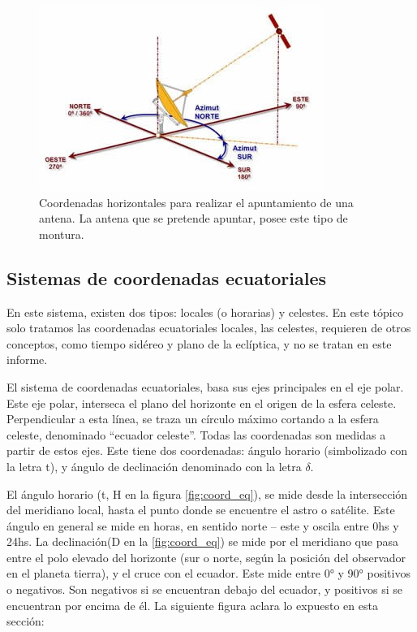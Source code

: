 \begin{figure}[ht!]
	\centering 
	\includegraphics{movimiento_antena_hor}
	\caption{Coordenadas horizontales para realizar el apuntamiento de una antena. La antena que se pretende apuntar, posee este tipo de montura.}
\end{figure}

\subsection{Sistemas de coordenadas ecuatoriales} 

En este sistema, existen dos tipos: locales (o horarias) y celestes. En este tópico solo tratamos las coordenadas ecuatoriales locales, las celestes, requieren de otros conceptos, como tiempo sidéreo y plano de la eclíptica, y no se tratan en este informe.


El sistema de coordenadas ecuatoriales, basa sus ejes principales en el eje polar. Este eje polar, interseca el plano del horizonte en el origen de la esfera celeste. Perpendicular a esta línea, se traza un círculo máximo cortando a la esfera celeste, denominado ``ecuador celeste''. Todas las coordenadas son medidas a partir de estos ejes. Este tiene dos coordenadas: ángulo horario (simbolizado con la letra t), y ángulo de declinación denominado con la letra $\delta$.

 
El ángulo horario (t, H en la figura \ref{fig:coord_eq}), se mide desde la intersección del meridiano local, hasta el punto donde se encuentre el astro o satélite. Este ángulo en general se mide en horas, en sentido norte – este y oscila entre 0hs y 24hs. 
La declinación(D en la  \ref{fig:coord_eq}) se mide por el meridiano que pasa entre el polo elevado del horizonte (sur o norte, según la posición del observador en el planeta tierra), y el cruce con el ecuador. Este mide entre 0° y 90° positivos o negativos. Son negativos si se encuentran debajo del ecuador, y positivos si se encuentran por encima de él. La siguiente figura aclara lo expuesto en esta sección: 


